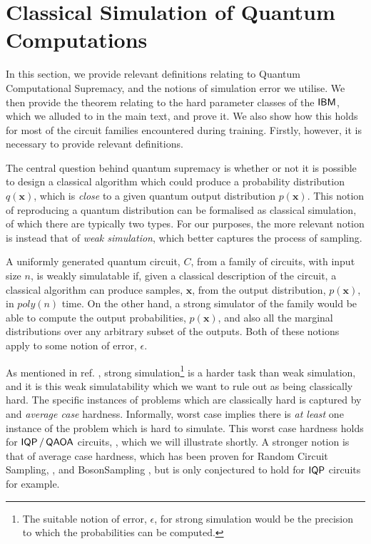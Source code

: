 

\section{Classical Simulation of Quantum Computations}
\label{supp_matt:hardness}

In this section, we provide relevant definitions relating to Quantum Computational Supremacy, and the notions of simulation error we utilise. We then provide the theorem relating to the hard parameter classes of the $\textsf{IBM}$, which we alluded to in the main text, and prove it. We also show how this holds for most of the circuit families encountered during training. Firstly, however, it is necessary to provide relevant definitions.

The central question behind quantum supremacy is whether or not it is possible to design a classical algorithm which could produce a probability distribution $q(\mathbf{x})$, which is \textit{close} to a given quantum output distribution $p(\mathbf{x})$. This notion of reproducing a quantum distribution can be formalised as classical simulation, of which there are typically two types. 
For our purposes, the more relevant notion is instead that of \textit{weak simulation}, which better captures the process of sampling.
\begin{definition}  \label{defn:strong_weak_sim}
    A uniformly generated quantum circuit, $C$, from a family of  circuits, with input size $n$, is weakly simulatable if, given a classical description of the circuit, a classical algorithm can produce samples, $\mathbf{x}$, from the output distribution, $p(\mathbf{x})$, in $poly(n)$ time. On the other hand, a strong simulator of the family would be able to compute the output probabilities, $p(\mathbf{x})$, and also all the marginal distributions over any arbitrary subset of the outputs. Both of these notions apply to some notion of error, $\epsilon$.
\end{definition}

As mentioned in ref. , strong simulation\footnote{The suitable notion of error, $\epsilon$, for strong simulation would be the precision to which the probabilities can be computed.} is a harder task than weak simulation, and it is this weak simulatability which we want to rule out as being classically hard. The specific instances of problems which are classically hard is captured by  and \textit{average case} hardness. Informally, worst case implies there is \textit{at least} one instance of the problem which is hard to simulate. This worst case hardness holds for $\operatorname{\textsf{IQP}}/\operatorname{\textsf{QAOA}}$ circuits, , which we will illustrate shortly. A stronger notion is that of average case hardness, which has been proven for Random Circuit Sampling, , and \textsf{BosonSampling} , but is only conjectured to hold for $\operatorname{\textsf{IQP}}$ circuits for example.

